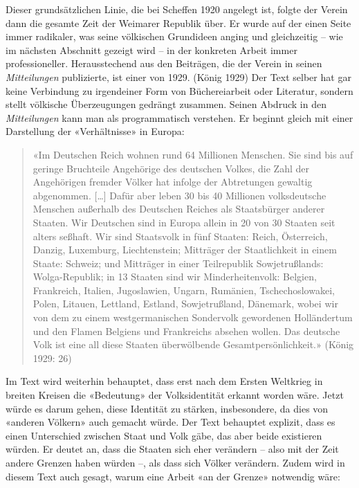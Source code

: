 \documentclass[a4paper,
fontsize=11pt,
oneside,
numbers=noperiodatend,
parskip=half-,
bibliography=totoc,
final
]{scrartcl}
\begin{document}
Dieser grundsätzlichen Linie, die bei Scheffen 1920 angelegt ist, folgte
der Verein dann die gesamte Zeit der Weimarer Republik über. Er wurde
auf der einen Seite immer radikaler, was seine völkischen Grundideen
anging und gleichzeitig -- wie im nächsten Abschnitt gezeigt wird -- in
der konkreten Arbeit immer professioneller. Herausstechend aus den
Beiträgen, die der Verein in seinen \emph{Mitteilungen} publizierte, ist
einer von 1929. (König 1929) Der Text selber hat gar keine Verbindung zu
irgendeiner Form von Büchereiarbeit oder Literatur, sondern stellt
völkische Überzeugungen gedrängt zusammen. Seinen Abdruck in den
\emph{Mitteilungen} kann man als programmatisch verstehen. Er beginnt
gleich mit einer Darstellung der «Verhältnisse» in Europa:

\begin{quote}
«Im Deutschen Reich wohnen rund 64 Millionen Menschen. Sie sind bis auf
geringe Bruchteile Angehörige des deutschen Volkes, die Zahl der
Angehörigen fremder Völker hat infolge der Abtretungen gewaltig
abgenommen. {[}\ldots{]} Dafür aber leben 30 bis 40 Millionen
volksdeutsche Menschen außerhalb des Deutschen Reiches als Staatsbürger
anderer Staaten. Wir Deutschen sind in Europa allein in 20 von 30
Staaten seit alters seßhaft. Wir sind Staatsvolk in fünf Staaten: Reich,
Österreich, Danzig, Luxemburg, Liechtenstein; Mitträger der
Staatlichkeit in einem Staate: Schweiz; und Mitträger in einer
Teilrepublik Sowjetrußlands: Wolga-Republik; in 13 Staaten sind wir
Minderheitenvolk: Belgien, Frankreich, Italien, Jugoslawien, Ungarn,
Rumänien, Tschechoslowakei, Polen, Litauen, Lettland, Estland,
Sowjetrußland, Dänemark, wobei wir von dem zu einem westgermanischen
Sondervolk gewordenen Holländertum und den Flamen Belgiens und
Frankreichs absehen wollen. Das deutsche Volk ist eine all diese Staaten
überwölbende Gesamtpersönlichkeit.» (König 1929: 26)
\end{quote}

Im Text wird weiterhin behauptet, dass erst nach dem Ersten Weltkrieg in
breiten Kreisen die «Bedeutung» der Volksidentität erkannt worden wäre.
Jetzt würde es darum gehen, diese Identität zu stärken, insbesondere, da
dies von «anderen Völkern» auch gemacht würde. Der Text behauptet
explizit, dass es einen Unterschied zwischen Staat und Volk gäbe, das
aber beide existieren würden. Er deutet an, dass die Staaten sich eher
verändern -- also mit der Zeit andere Grenzen haben würden --, als dass
sich Völker verändern. Zudem wird in diesem Text auch gesagt, warum eine
Arbeit «an der Grenze» notwendig wäre:
\end{document}

